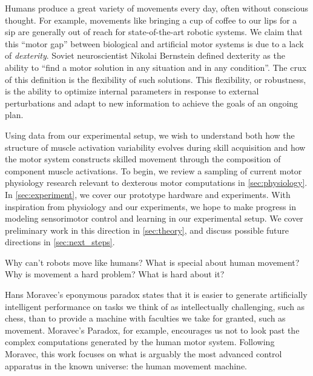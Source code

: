 \documentclass[../main.tex]{subfiles}
\begin{document}
Humans produce a great variety of movements every day, often without conscious thought. For example, movements like bringing a cup of coffee to our lips for a sip are generally out of reach for state-of-the-art robotic systems. We claim that this ``motor gap'' between biological and artificial motor systems is due to a lack of \emph{dexterity}. Soviet neuroscientist Nikolai Bernstein defined dexterity as the ability to ``find a motor solution in any situation and in any condition\cite{Bernstein1967}''. The crux of this definition is the flexibility of such solutions. This flexibility, or robustness\cite{kitanoBiologicalRobustness2004}, is the ability to optimize internal parameters in response to external perturbations and adapt to new information to achieve the goals of an ongoing plan.


Using data from our experimental setup, we wish to understand both how the structure of muscle activation variability evolves during skill acquisition and how the motor system constructs skilled movement through the composition of component muscle activations. To begin, we review a  sampling of current motor physiology research relevant to dexterous motor computations in \cref{sec:physiology}. In \cref{sec:experiment}, we cover our prototype hardware and experiments. With inspiration from physiology and our experiments, we hope to make progress in modeling sensorimotor control and learning in our experimental setup. We cover preliminary work in this direction in \cref{sec:theory}, and discuss possible future directions in \cref{sec:next_steps}.

Why can't robots move like humans? What is special about human movement? Why is movement a hard problem? What is hard about it?

Hans Moravec's eponymous paradox states that it is easier to generate artificially intelligent performance on tasks we think of as intellectually challenging, such as chess, than to provide a machine with faculties we take for granted, such as movement. Moravec's Paradox, for example, encourages us not to look past the complex computations generated by the human motor system. Following Moravec, this work focuses on what is arguably the most advanced control apparatus in the known universe: the human movement machine.
\end{document}
